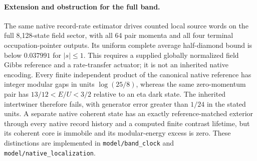 \paragraph{Extension and obstruction for the full band.}
The same native record-rate estimator drives counted local source words on
the full 8,128-state field sector, with all 64 pair momenta and all four
terminal occupation-pointer outputs. Its uniform complete average
half-diamond bound is below $0.037991$ for $|s|\le1$. This requires a supplied
globally normalized field Gibbs reference and a rate-transfer actuator;
it is not an inherited native encoding. Every finite independent product
of the canonical native reference has integer modular gaps in units
$\log(25/8)$, whereas the same zero-momentum pair has
$13/12<E/U<3/2$ relative to an eta dark state. The inherited intertwiner
therefore fails, with generator error greater than $1/24$ in the stated
units. A separate native coherent state has an exactly reference-matched
exterior through every native record history and a computed finite contrast
lifetime, but its coherent core is immobile and its modular-energy excess
is zero. These distinctions are implemented in \texttt{model/band\_clock}
and \texttt{model/native\_localization}.

